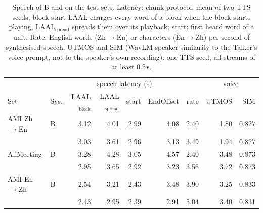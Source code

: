 \begin{table}[!t]
\centering\small
\setlength{\tabcolsep}{3.5pt}
\begin{tabular}{llrrrrrrr}
\toprule
 & & \multicolumn{4}{c}{speech latency (s)} & & \multicolumn{2}{c}{voice} \\
\cmidrule(lr){3-6}\cmidrule(lr){8-9}
Set & Sys. & LAAL$_\text{block}$ & LAAL$_\text{spread}$ & start & EndOffset & rate & UTMOS & SIM \\
\midrule
AMI Zh$\rightarrow$En & B & 3.12 & 4.01 & 2.99 & 4.08 & 2.40 & 1.80 & 0.827 \\
 & \sys{} & 3.03 & 3.61 & 2.96 & 3.13 & 3.49 & 1.94 & 0.827 \\
\midrule
AliMeeting & B & 3.28 & 4.28 & 3.05 & 4.57 & 2.40 & 3.48 & 0.873 \\
 & \sys{} & 2.95 & 3.65 & 2.92 & 3.23 & 3.56 & 3.72 & 0.873 \\
\midrule
AMI En$\rightarrow$Zh & B & 2.54 & 3.21 & 2.43 & 3.48 & 3.90 & 3.25 & 0.833 \\
 & \sys{} & 2.43 & 2.95 & 2.39 & 2.91 & 5.04 & 3.40 & 0.831 \\
\bottomrule
\end{tabular}
\caption{Speech of B and \sys{} on the test sets. Latency: chunk protocol, mean of two TTS seeds; block-start LAAL charges every word of a block when the block starts playing, LAAL$_\text{spread}$ spreads them over its playback; start: first heard word of a unit. Rate: English words (Zh$\rightarrow$En) or characters (En$\rightarrow$Zh) per second of synthesised speech. UTMOS and SIM (WavLM speaker similarity to the Talker's voice prompt, not to the speaker's own recording): one TTS seed, all streams of at least 0.5\,s.}
\label{tab:speech}
\end{table}

\begin{table}[!t]
\centering\small
\setlength{\tabcolsep}{3pt}
\caption{Paired speech-latency differences on the test sets (seconds): difference and 95\% meeting-bootstrap interval (10{,}000 resamples, two TTS seeds pooled per meeting). Exact sign-flip $p$ values are given in the text where used; no multiple-test correction.}
\label{tab:speech2}
\end{table}
